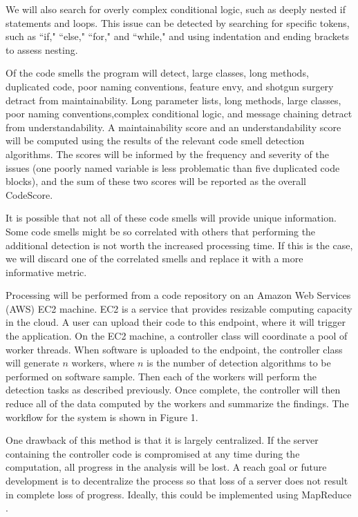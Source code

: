 \documentclass{sig-alternate}
\begin{document}
We will also search for overly complex conditional logic, such as deeply nested if statements and loops. This issue can be detected by searching for specific tokens, such as ``if," ``else," ``for," and ``while," and using indentation and ending brackets to assess nesting.

Of the code smells the program will detect, large classes, long methods, duplicated code, poor naming conventions, feature envy, and shotgun surgery detract from maintainability. Long parameter lists, long methods, large classes, poor naming conventions,complex conditional logic, and message chaining detract from understandability. A maintainability score and an understandability score will be computed using the results of the relevant code smell detection algorithms. The scores will be informed by the frequency and severity of the issues (one poorly named variable is less problematic than five duplicated code blocks), and the sum of these two scores will be reported as the overall CodeScore.

It is possible that not all of these code smells will provide unique information. Some code smells might be so correlated with others that performing the additional detection is not worth the increased processing time. If this is the case, we will discard one of the correlated smells and replace it with a more informative metric.

Processing will be performed from a code repository on an Amazon Web Services (AWS) EC2 machine. EC2 is a service that provides resizable computing capacity in the cloud. A user can upload their code to this endpoint, where it will trigger the application. On the EC2 machine, a controller class will coordinate a pool of worker threads. When software is uploaded to the endpoint, the controller class will generate $n$ workers, where $n$ is the number of detection algorithms to be performed on software sample. Then each of the workers will perform the detection tasks as described previously. Once complete, the controller will then reduce all of the data computed by the workers and summarize the findings. The workflow for the system is shown in Figure 1. 

One drawback of this method is that it is largely centralized. If the server containing the controller code is compromised at any time during the computation, all progress in the analysis will be lost. A reach goal or future development is to decentralize the process so that loss of a server does not result in complete loss of progress. Ideally, this could be implemented using MapReduce \cite{dean2008mapreduce}.
\end{document}
